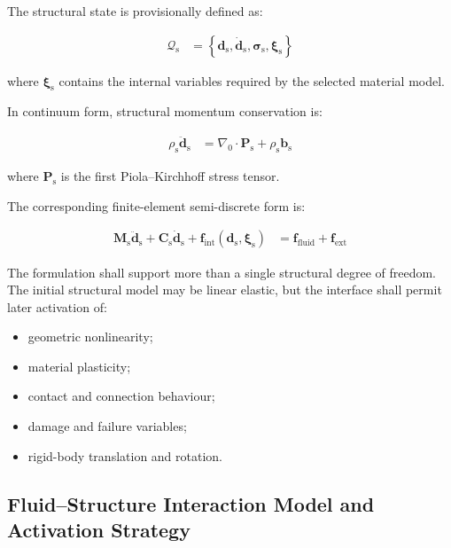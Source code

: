 The structural state is provisionally defined as:

\begin{align}
  \mathcal{Q}_{\mathrm{s}}
  &=
  \left\{
    \mathbf{d}_{\mathrm{s}},
    \dot{\mathbf{d}}_{\mathrm{s}},
    \boldsymbol{\sigma}_{\mathrm{s}},
    \boldsymbol{\xi}_{\mathrm{s}}
  \right\}
  \label{eq:res-str-fsi-structural-state}
\end{align}

where $\boldsymbol{\xi}_{\mathrm{s}}$ contains the internal variables
required by the selected material model.

In continuum form, structural momentum conservation is:

\begin{align}
  \rho_{\mathrm{s}}
  \ddot{\mathbf{d}}_{\mathrm{s}}
  &=
  \nabla_{0}\cdot\mathbf{P}_{\mathrm{s}}
  +
  \rho_{\mathrm{s}}\mathbf{b}_{\mathrm{s}}
  \label{eq:res-str-fsi-structural-momentum}
\end{align}

where $\mathbf{P}_{\mathrm{s}}$ is the first
Piola--Kirchhoff stress tensor.

The corresponding finite-element semi-discrete form is:

\begin{align}
  \mathbf{M}_{\mathrm{s}}
  \ddot{\mathbf{d}}_{\mathrm{s}}
  +
  \mathbf{C}_{\mathrm{s}}
  \dot{\mathbf{d}}_{\mathrm{s}}
  +
  \mathbf{f}_{\mathrm{int}}
  \left(
    \mathbf{d}_{\mathrm{s}},
    \boldsymbol{\xi}_{\mathrm{s}}
  \right)
  &=
  \mathbf{f}_{\mathrm{fluid}}
  +
  \mathbf{f}_{\mathrm{ext}}
  \label{eq:res-str-fsi-semidiscrete-structural-equation}
\end{align}

The formulation shall support more than a single structural
degree of freedom. The initial structural model may be linear elastic,
but the interface shall permit later activation of:

\begin{itemize}
  \item geometric nonlinearity;
  \item material plasticity;
  \item contact and connection behaviour;
  \item damage and failure variables;
  \item rigid-body translation and rotation.
\end{itemize}

\subsection{Fluid--Structure Interaction Model and Activation Strategy}
\label{sec:res-str-fsi-local-coupling}

